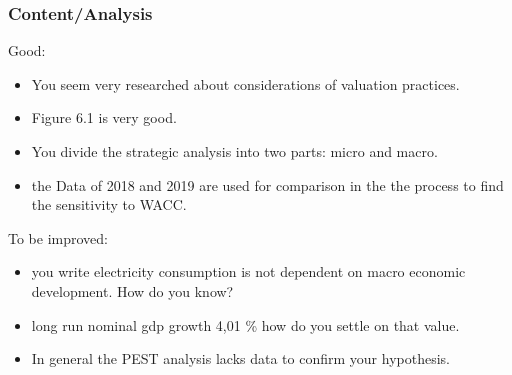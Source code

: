 \documentclass{beamer}
\begin{document}
\begin{frame}
\frametitle{Content/Analysis}

Good:

\begin{itemize}
    \item You seem very researched about considerations of valuation practices.
    \item Figure 6.1 is very good.
    \item You divide the strategic analysis into two parts: micro and macro.
    \item the Data of 2018 and 2019 are used for comparison in the the process to find the sensitivity to WACC.
\end{itemize}

To be improved:

\begin{itemize}
    \item you write electricity consumption is not dependent on macro economic development. How do you know?
    \item  long run nominal gdp growth 4,01 \% how do you settle on that value.
    \item In general the PEST analysis lacks data to confirm your hypothesis.
\end{itemize}

\end{frame}
\end{document}
